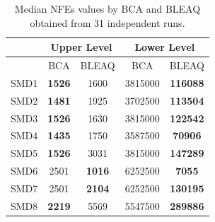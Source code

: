 \documentclass[conference]{IEEEtran}
\begin{document}
\begin{table}[!ht]
\renewcommand{\arraystretch}{1.3}
    \caption{Median NFEs values by BCA and BLEAQ obtained from 31 independent runs.}
    \label{tab:ul-comparative-fes}
    \centering
    \begin{tabular}{|c|c|c||c|c|}
\hline
& \multicolumn{2}{c||}{Upper Level} & \multicolumn{2}{c|}{Lower Level} \\ \hline
& BCA & BLEAQ & BCA & BLEAQ \\ \hline
SMD1 & \textbf{1526} & 1600 & 3815000 & \textbf{116088} \\ \hline
SMD2 & \textbf{1481} & 1925 & 3702500 & \textbf{113504} \\ \hline
SMD3 & \textbf{1526} & 1630 & 3815000 & \textbf{122542} \\ \hline
SMD4 & \textbf{1435} & 1750 & 3587500 & \textbf{70906} \\ \hline
SMD5 & \textbf{1526} & 3031 & 3815000 & \textbf{147289} \\ \hline
SMD6 &     2501      & \textbf{1016} & 6252500 & \textbf{7055} \\ \hline
SMD7 &     2501      & \textbf{2104} & 6252500 & \textbf{130195} \\ \hline
SMD8 & \textbf{2219} & 5569 & 5547500 & \textbf{289886} \\ \hline
    \end{tabular}
\end{table}
\end{document}
